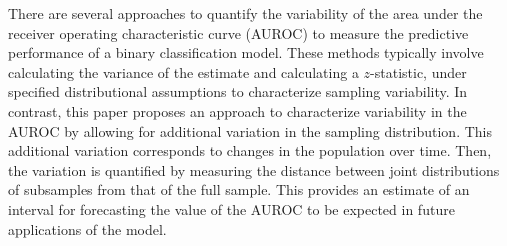 There are several approaches to quantify the variability of the area under the receiver operating characteristic curve (AUROC) to measure the predictive performance of a binary classification model.
%
These methods typically involve calculating the variance of the estimate and calculating a $z$-statistic, under specified distributional assumptions
to characterize sampling variability.
%
%
In contrast, this paper proposes an approach
to characterize variability in the AUROC by allowing for additional variation in the sampling distribution.
%
This additional variation corresponds to changes in the population over time.
%
Then, the variation is quantified by measuring the distance between joint distributions of subsamples from that of the full sample.
%
This provides an estimate of an interval for forecasting the value of the AUROC to be expected in future applications of the model.
%

%
%

